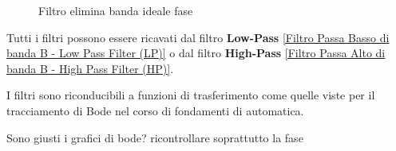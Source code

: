             \begin{figure}[H]
                \centering
                \caption{Filtro elimina banda ideale fase}
                \label{fig:BS filter phase}
            \end{figure} 
            Tutti i filtri possono essere ricavati dal filtro \textbf{Low-Pass} \ref{Filtro Passa Basso di banda B - Low Pass Filter (LP)}
            o dal filtro \textbf{High-Pass} \ref{Filtro Passa Alto di banda B - High Pass Filter (HP)}.

            I filtri sono riconducibili a funzioni di trasferimento come quelle viste per il tracciamento di Bode nel corso
            di fondamenti di automatica.

            Sono giusti i grafici di bode? ricontrollare soprattutto la fase
